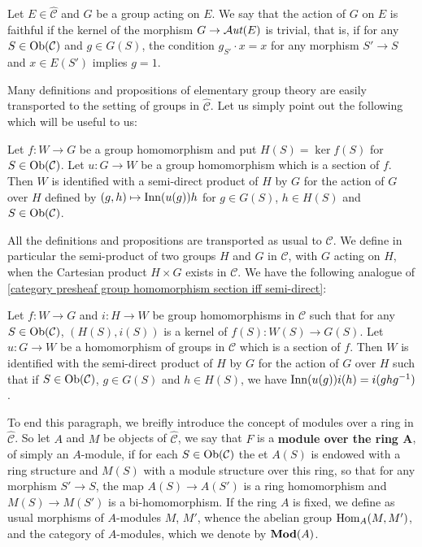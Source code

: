 \begin{definition}
Let $E\in\widehat{\mathcal{C}}$ and $G$ be a group acting on $E$. We say that the action of $G$ on $E$ is faithful if the kernel of the morphism $G\to\operatorname{\mathcal{A}\hspace*{-0.2pt}\textit{ut}\hspace{0.5pt}}(E)$ is trivial, that is, if for any $S\in\mathrm{Ob}(\mathcal{C})$ and $g\in G(S)$, the condition $g_{S'}\cdot x=x$ for any morphism $S'\to S$ and $x\in E(S')$ implies $g=1$.
\end{definition}

Many definitions and propositions of elementary group theory are easily transported to the setting of groups in $\widehat{\mathcal{C}}$. Let us simply point out the following which will be useful to us:
\begin{proposition}\label{category presheaf group homomorphism section iff semi-direct}
Let $f:W\to G$ be a group homomorphism and put $H(S)=\ker f(S)$ for $S\in\mathrm{Ob}(\mathcal{C})$. Let $u:G\to W$ be a group homomorphism which is a section of $f$. Then $W$ is identified with a semi-direct product of $H$ by $G$ for the action of $G$ over $H$ defined by $(g,h)\mapsto\mathrm{Inn}(u(g))h$ for $g\in G(S)$, $h\in H(S)$ and $S\in\mathrm{Ob}(\mathcal{C})$.
\end{proposition}

All the definitions and propositions are transported as usual to $\mathcal{C}$. We define in particular the semi-product of two groups $H$ and $G$ in $\mathcal{C}$, with $G$ acting on $H$, when the Cartesian product $H\times G$ exists in $\mathcal{C}$. We have the following analogue of \cref{category presheaf group homomorphism section iff semi-direct}:
\begin{proposition}\label{category group homomorphism section iff semi-direct}
Let $f:W\to G$ and $i:H\to W$ be group homomorphisms in $\mathcal{C}$ such that for any $S\in\mathrm{Ob}(\mathcal{C})$, $(H(S),i(S))$ is a kernel of $f(S):W(S)\to G(S)$. Let $u:G\to W$ be a homomorphism of groups in $\mathcal{C}$ which is a section of $f$. Then $W$ is identified with the semi-direct product of $H$ by $G$ for the action of $G$ over $H$ such that if $S\in\mathrm{Ob}(\mathcal{C})$, $g\in G(S)$ and $h\in H(S)$, we have $\mathrm{Inn}(u(g))i(h)=i(ghg^{-1})$.
\end{proposition}

To end this paragraph, we breifly introduce the concept of modules over a ring in $\widehat{\mathcal{C}}$. So let $A$ and $M$ be objects of $\widehat{\mathcal{C}}$, we say that $F$ is a \textbf{module over the ring $\bm{A}$}, of simply an $A$-module, if for each $S\in\mathrm{Ob}(\mathcal{C})$ the et $A(S)$ is endowed with a ring structure and $M(S)$ with a module structure over this ring, so that for any morphism $S'\to S$, the map $A(S)\to A(S')$ is a ring homomorphism and $M(S)\to M(S')$ is a bi-homomorphism. If the ring $A$ is fixed, we define as usual morphisms of $A$-modules $M$, $M'$, whence the abelian group $\mathrm{Hom}_A(M,M')$, and the category of $A$-modules, which we denote by $\mathbf{Mod}(A)$.

